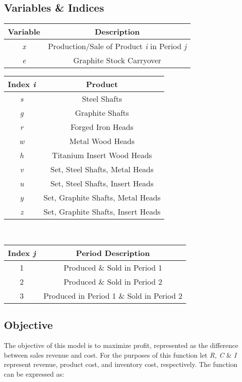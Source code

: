 \documentclass{article}
\begin{document}
\subsection{Variables \& Indices}
\begin{tabular}{ |c | c| }
\hline
\textbf{Variable} & \textbf{Description} \\
\hline
\textit{x} & Production/Sale of Product \textit{i} in Period \textit{j} \\
\textit{e} & Graphite Stock Carryover \\
\hline
\end{tabular}
\vspace{5mm}

\noindent
\begin{tabular}{| c | c |}
\hline
\textbf{Index \textit{i}} & \textbf{Product} \\
\hline
\textit{s} & Steel Shafts \\
\textit{g} & Graphite Shafts \\
\textit{r} & Forged Iron Heads \\
\textit{w} & Metal Wood Heads \\
\textit{h} & Titanium Insert Wood Heads \\
\textit{v} & Set, Steel Shafts, Metal Heads \\
\textit{u} & Set, Steel Shafts, Insert Heads \\
\textit{y} & Set, Graphite Shafts, Metal Heads \\
\textit{z} & Set, Graphite Shafts, Insert Heads \\
\hline
\end{tabular}
\vspace{5mm}
\\
\begin{tabular}{ | c | c | }
\hline
\textbf{Index \textit{j}} & \textbf{Period Description} \\
\hline
1 & Produced \& Sold in Period 1 \\
2 & Produced \& Sold in Period 2 \\
3 & Produced in Period 1 \& Sold in Period 2 \\
\hline
\end{tabular}

\subsection{Objective}
The objective of this model is to maximize profit, represented as the difference between sales revenue and cost.  For the purposes of this function let \textit{R, C} \& \textit{I} represent revenue, product cost, and inventory cost, respectively.  The function can be expressed as:
\end{document}
